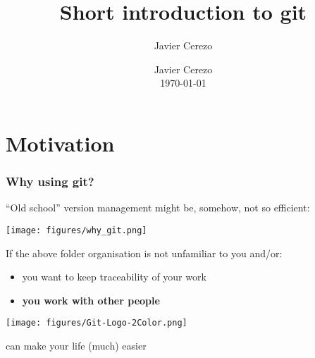 \documentclass[xcolor=dvipsnames,10pt]{beamer}
\title[Intro to git]{\textbf{Short introduction to git}}
\author{Javier Cerezo}
\institute{}
\date{Javier Cerezo\\\vspace*{0.2cm}\today} %
\begin{document}
\newcommand{\wpl}{$\omega^{+}$}
\newcommand{\wm}{$\omega^{-}$}
\newcommand{\cis}{\textit{cis}}
\newcommand{\trans}{\textit{trans}}
\newcommand{\alltrans}{\textit{all-trans}}
\newcommand{\monocis}{\textit{monocis}}
\newcommand{\dicis}{\textit{dicis}}

\begin{frame}[t,plain]
  \titlepage
\end{frame}

%   

\section{Motivation}
\begin{frame}
 \frametitle{Why using git?}
 
 ``Old school'' version management might be, somehow, not so efficient:
 
 \begin{center}
 \texttt{[image: figures/why\_git.png]}  
 \end{center}

 
 If the above folder organisation is not unfamiliar to you and/or:
 
 \begin{itemize}
  \item you want to keep traceability of your work
  \item \textbf{you work with other people}
 \end{itemize}

\vspace*{0.3cm}
 
 \begin{center}
 \begin{minipage}{0.2\textwidth}
  \texttt{[image: figures/Git-Logo-2Color.png]}  
 \end{minipage}
  \begin{minipage}{0.7\textwidth}
 can make your life (much) easier
  \end{minipage}
 \end{center}
  
\end{frame}
\end{document}
